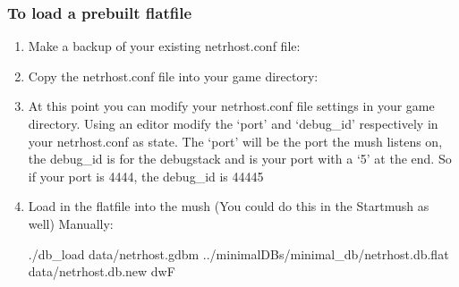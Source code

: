 \documentclass[letterpaper,10pt,english]{sphinxmanual}
\begin{document}
\subsubsection{To load a prebuilt flatfile}
\label{\detokenize{install:to-load-a-prebuilt-flatfile}}\begin{enumerate}
%
\item {} 
\sphinxAtStartPar
Make a backup of your existing netrhost.conf file:

\begin{sphinxVerbatim}[commandchars=\\\{\}]
  
\end{sphinxVerbatim}

\item {} 
\sphinxAtStartPar
Copy the netrhost.conf file into your game directory:

\begin{sphinxVerbatim}[commandchars=\\\{\}]
   
\end{sphinxVerbatim}

\item {} 
\sphinxAtStartPar
At this point you can modify your netrhost.conf file settings in your game directory.
Using an editor modify the ‘port’ and ‘debug\_id’ respectively in your netrhost.conf as state.
The ‘port’ will be the port the mush listens on, the debug\_id is for the debug\sphinxhyphen{}stack and is
your port with a ‘5’ at the end.  So if your port is 4444, the debug\_id is 44445

\item {} 
\sphinxAtStartPar
Load in the flatfile into the mush (You could do this in the Startmush as well)
Manually:

\begin{sphinxVerbatim}[commandchars=\\\{\}]
 
\end{sphinxVerbatim}

\sphinxAtStartPar
./db\_load data/netrhost.gdbm ../minimal\sphinxhyphen{}DBs/minimal\_db/netrhost.db.flat data/netrhost.db.new dwF


\end{enumerate}
\end{document}
